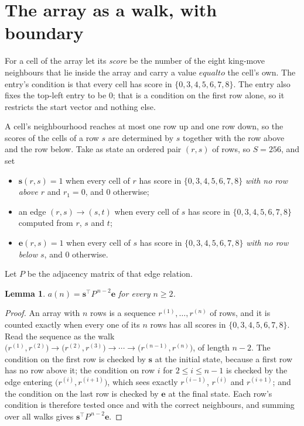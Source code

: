 \documentclass[11pt,a4paper]{article}
\theoremstyle{plain}
\newtheorem{lemma}[theorem]{Lemma}
\theoremstyle{definition}
\begin{document}
\section{The array as a walk, with boundary}

For a cell of the array let its \emph{score} be the number of the eight king-move neighbours that lie inside
the array and carry a value $equal to$ the cell's own. The entry's condition is that every cell
has score in $\{0,3,4,5,6,7,8\}$. The entry also fixes the top-left entry to be $0$; that is a condition on the first row alone, so it restricts the start vector and nothing else.

A cell's neighbourhood reaches at most one row up and one row down, so the scores of the
cells of a row $s$ are determined by $s$ together with the row above and the row below.
Take as state an ordered pair $(r,s)$ of rows, so $S=256$, and set
\begin{itemize}
\item $\mathbf{s}(r,s)=1$ when every cell of $r$ has score in $\{0,3,4,5,6,7,8\}$ \emph{with no row
above $r$} and $r_1=0$, and $0$ otherwise;
\item an edge $(r,s)\to(s,t)$ when every cell of $s$ has score in $\{0,3,4,5,6,7,8\}$ computed from
$r$, $s$ and $t$;
\item $\mathbf{e}(r,s)=1$ when every cell of $s$ has score in $\{0,3,4,5,6,7,8\}$ \emph{with no row
below $s$}, and $0$ otherwise.
\end{itemize}
Let $P$ be the adjacency matrix of that edge relation.

\begin{lemma}\label{lem:walk}
$a(n)=\mathbf{s}^{\!\top}P^{\,n-2}\mathbf{e}$ for every $n\ge2$.
\end{lemma}

\begin{proof}
An array with $n$ rows is a sequence $r^{(1)},\dots,r^{(n)}$ of rows, and it is counted
exactly when every one of its $n$ rows has all scores in $\{0,3,4,5,6,7,8\}$. Read the sequence as the
walk $\bigl(r^{(1)},r^{(2)}\bigr)\to\bigl(r^{(2)},r^{(3)}\bigr)\to\cdots\to
\bigl(r^{(n-1)},r^{(n)}\bigr)$, of length $n-2$. The condition on the first row is
checked by $\mathbf{s}$ at the initial state, because a first row has no row above it; the
condition on row $i$ for $2\le i\le n-1$ is checked by the edge entering
$\bigl(r^{(i)},r^{(i+1)}\bigr)$, which sees exactly $r^{(i-1)}$, $r^{(i)}$ and
$r^{(i+1)}$; and the condition on the last row is checked by $\mathbf{e}$ at the final
state. Each row's condition is therefore tested once and with the correct neighbours, and
summing over all walks gives $\mathbf{s}^{\!\top}P^{\,n-2}\mathbf{e}$.
\end{proof}
\end{document}
